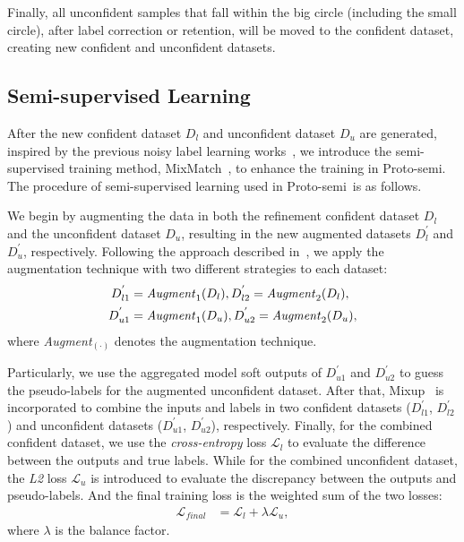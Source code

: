 \documentclass[letterpaper]{article} %
\newcommand{\method}{Proto-semi}
\begin{document}
Finally, all unconfident samples that fall within the big circle (including the small circle), after label correction or retention, will be moved to the confident dataset, creating new confident and unconfident datasets.

\subsection{Semi-supervised Learning}
After the new confident dataset $D_l$ and unconfident dataset $D_u$ are generated, inspired by the previous noisy label learning works~\cite{DBLP:journals/corr/abs-2303-10802, DBLP:journals/corr/abs-2007-08199, DBLP:conf/iclr/WeiZ0L0022}, we introduce the semi-supervised training method, MixMatch~\cite{DBLP:conf/nips/BerthelotCGPOR19}, to enhance the training in \method. 
The procedure of semi-supervised learning used in \method\ is as follows.

We begin by augmenting the data in both the refinement confident dataset $D_l$ and the unconfident dataset $D_u$, resulting in the new augmented datasets $D_{l}^{'}$ and $D_{u}^{'}$, respectively. 
Following the approach described in~\cite{DBLP:conf/nips/BaiYHYLMNL21}, we apply the augmentation technique with two different strategies to each dataset:
\begin{align}
  D_{l1}^{'} & = \text{\textit{Augment}}_{1}(D_l),  D_{l2}^{'} = \text{\textit{Augment}}_{2}(D_l), \label{equ:conf_aug}\\
  D_{u1}^{'} & = \text{\textit{Augment}}_{1}(D_u),  D_{u2}^{'} = \text{\textit{Augment}}_{2}(D_u),\label{equ:unconf_aug}
\end{align}
where \textit{Augment}$_{(\cdot)}$ denotes the augmentation technique. 

Particularly, we use the aggregated model soft outputs of $D_{u1}^{'}$ and $D_{u2}^{'}$ to guess the pseudo-labels for the augmented unconfident dataset. After that, Mixup~\cite{DBLP:conf/iclr/ZhangCDL18} is incorporated to combine the inputs and labels in two confident datasets ($D_{l1}^{'}$, $D_{l2}^{'}$) and unconfident datasets ($D_{u1}^{'}$, $D_{u2}^{'}$), respectively.
Finally, for the combined confident dataset, we use the \textit{cross-entropy} loss $\mathcal{L}_{l}$ to evaluate the difference between the outputs and true labels. While for the combined unconfident dataset, the \textit{L2} loss $\mathcal{L}_{u}$ is introduced to evaluate the discrepancy between the outputs and pseudo-labels. And the final training loss is the weighted sum of the two losses:
\begin{align}
  \mathcal{L}_{final} & = \mathcal{L}_{l} +  \lambda \mathcal{L}_{u}\label{equ:loss}, 
\end{align}
where $\lambda$ is the balance factor.
\end{document}
